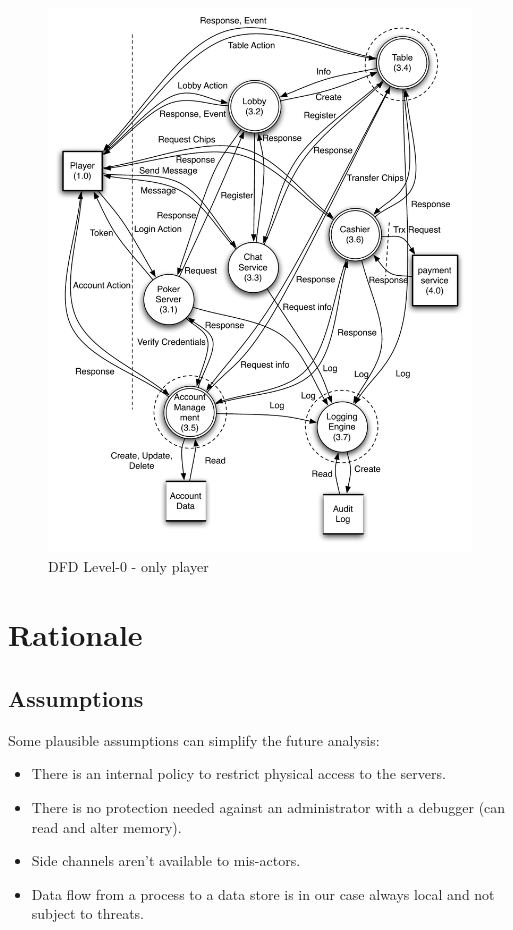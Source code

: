 \documentclass[a4paper,11pt]{report}
\begin{document}
\begin{figure}[htpb]
  \begin{center}
    \includegraphics[scale=0.7]{dfd_level_0_player}
  \end{center}
  \caption{DFD Level-0 - only player}\label{fig:level_0_player}
\end{figure}

\section{Rationale}
\subsection{Assumptions}
Some plausible assumptions can simplify the future analysis:
\begin{itemize}
\item There is an internal policy to restrict physical access to the servers.
\item There is no protection needed against an administrator with a debugger (can read and alter memory).
\item Side channels aren't available to mis-actors.
\item Data flow from a process to a data store is in our case always local and not subject to threats.
\end{itemize}
\end{document}
